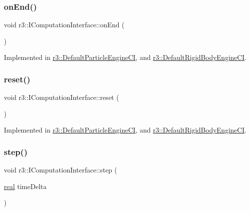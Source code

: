 \subsubsection{\texorpdfstring{on\+End()}{onEnd()}}
{\footnotesize\ttfamily void r3\+::\+I\+Computation\+Interface\+::on\+End (\begin{DoxyParamCaption}{ }\end{DoxyParamCaption})\hspace{0.3cm}{\ttfamily [pure virtual]}}



Implemented in \mbox{\hyperlink{classr3_1_1_default_particle_engine_c_i_a6a34c77436d8133560eaa7366c740119}{r3\+::\+Default\+Particle\+Engine\+CI}}, and \mbox{\hyperlink{classr3_1_1_default_rigid_body_engine_c_i_ad7746126ebd5aab4cfc352dd9facabb2}{r3\+::\+Default\+Rigid\+Body\+Engine\+CI}}.

\mbox{\label{classr3_1_1_i_computation_interface_a6069989c54ffd4e714788d0968851007}} 
\subsubsection{\texorpdfstring{reset()}{reset()}}
{\footnotesize\ttfamily void r3\+::\+I\+Computation\+Interface\+::reset (\begin{DoxyParamCaption}{ }\end{DoxyParamCaption})\hspace{0.3cm}{\ttfamily [pure virtual]}}



Implemented in \mbox{\hyperlink{classr3_1_1_default_particle_engine_c_i_a97757c62b4cb1266da29e2b5625bb9d3}{r3\+::\+Default\+Particle\+Engine\+CI}}, and \mbox{\hyperlink{classr3_1_1_default_rigid_body_engine_c_i_a06bd27e94b26017e7960e01f6e884e33}{r3\+::\+Default\+Rigid\+Body\+Engine\+CI}}.

\mbox{\label{classr3_1_1_i_computation_interface_aaa12bcc35005f32a1984b38de97696cb}} 
\subsubsection{\texorpdfstring{step()}{step()}}
{\footnotesize\ttfamily void r3\+::\+I\+Computation\+Interface\+::step (\begin{DoxyParamCaption}\item[{\mbox{\hyperlink{namespacer3_ab2016b3e3f743fb735afce242f0dc1eb}{real}}}]{time\+Delta }\end{DoxyParamCaption})\hspace{0.3cm}{\ttfamily [pure virtual]}}



